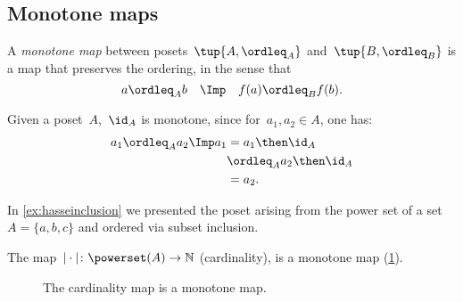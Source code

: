 \subsection{Monotone maps}

\begin{definition}
A \emph{monotone map} between posets~$\tup{A, \ordleq_A}$ and~$\tup{B, \ordleq_B}$ is a map that preserves the ordering, in the sense that 
\begin{equation}
 a \ordleq_A b \quad \Imp \quad f(a) \ordleq_B f(b).
\end{equation}

\begin{comment}\noindent A monotone map is an \emph{isomorphism} if the other direction
of the implication holds as well:
\begin{equation}
 a \leq_A b \quad \Leftrightarrow \quad f(a) \leq_B f(b).
\end{equation}
\end{comment}
\end{definition}
\begin{remark}
Given a poset~$A$,~$\id_A$ is monotone, since for~$a_1,a_2\in A$, one has:
\begin{equation}
\begin{aligned}
a_1\ordleq_A a_2 \Imp a_1&=a_1\then \id_A\\
&\ordleq_A a_2\then \id_A \\
&= a_2.
\end{aligned}
\end{equation}
\end{remark}

\begin{example}
\end{example}

\begin{example}
\end{example}


\begin{example}
In \cref{ex:hasseinclusion} we presented the poset arising from the power set of a set~$A=\{a,b,c\}$ and ordered via subset inclusion.

The map~$\vert \cdot \vert \colon \powerset(A)\to \mathbb{N}$ (cardinality), is a monotone map (\cref{fig:cardinality}).
\begin{figure}[h!]
\begin{center}
\end{center}
\caption{The cardinality map is a monotone map. \label{fig:cardinality}}
\end{figure}
\end{example}


